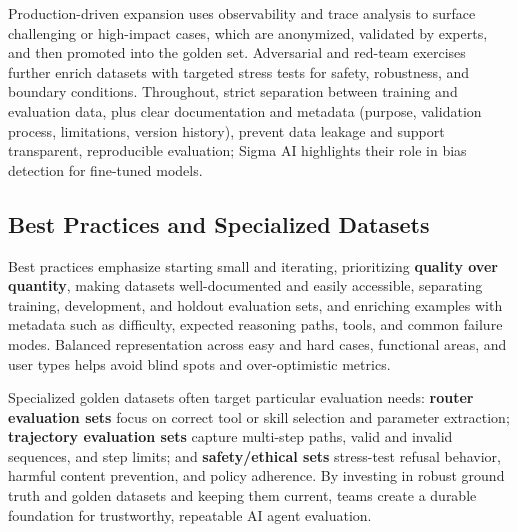 \begin{TNtwocol}
Production-driven expansion uses observability and trace analysis to surface challenging or high-impact cases, which are anonymized, validated by experts, and then promoted into the golden set. Adversarial and red-team exercises further enrich datasets with targeted stress tests for safety, robustness, and boundary conditions. Throughout, strict separation between training and evaluation data, plus clear documentation and metadata (purpose, validation process, limitations, version history), prevent data leakage and support transparent, reproducible evaluation; Sigma AI highlights their role in bias detection for fine-tuned models.
​

\subsection*{Best Practices and Specialized Datasets}

Best practices emphasize starting small and iterating, prioritizing \textbf{quality over quantity}, making datasets well-documented and easily accessible, separating training, development, and holdout evaluation sets, and enriching examples with metadata such as difficulty, expected reasoning paths, tools, and common failure modes. Balanced representation across easy and hard cases, functional areas, and user types helps avoid blind spots and over-optimistic metrics.

Specialized golden datasets often target particular evaluation needs: \textbf{router evaluation sets} focus on correct tool or skill selection and parameter extraction; \textbf{trajectory evaluation sets} capture multi-step paths, valid and invalid sequences, and step limits; and \textbf{safety/ethical sets} stress-test refusal behavior, harmful content prevention, and policy adherence. By investing in robust ground truth and golden datasets and keeping them current, teams create a durable foundation for trustworthy, repeatable AI agent evaluation.

\end{TNtwocol}

